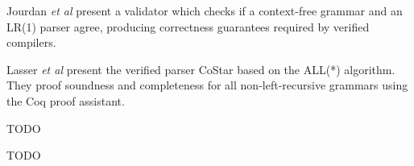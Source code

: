 \begin{isabellebody}
\begin{isamarkuptext}
Jourdan \textit{et al} \cite{Jourdan:2012} present a validator which checks if a context-free grammar
and an LR(1) parser agree, producing correctness guarantees required by verified compilers.

Lasser \textit{et al} \cite{Lasser:2021} present the verified parser CoStar based on the ALL(*) algorithm.
They proof soundness and completeness for all non-left-recursive grammars using the Coq proof assistant.%
\end{isamarkuptext}\isamarkuptrue%
%
\isadelimdocument
%
\endisadelimdocument
%
\isatagdocument
%
\isamarkuptrue%
%
\endisatagdocument
{\isafolddocument}%
%
\isadelimdocument
%
\endisadelimdocument
%
\begin{isamarkuptext}%
TODO%
\end{isamarkuptext}\isamarkuptrue%
%
\isadelimdocument
%
\endisadelimdocument
%
\isatagdocument
%
\isamarkuptrue%
%
\endisatagdocument
{\isafolddocument}%
%
\isadelimdocument
%
\endisadelimdocument
%
\begin{isamarkuptext}%
TODO%
\end{isamarkuptext}\isamarkuptrue%
%
\isadelimtheory
%
\endisadelimtheory
%
\isatagtheory
%
\endisatagtheory
{\isafoldtheory}%
%
\isadelimtheory
%
\endisadelimtheory
%
\end{isabellebody}%
\endinput
